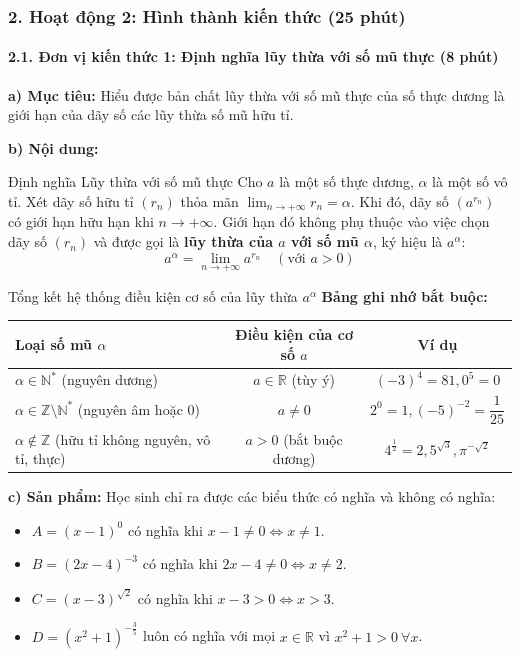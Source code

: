 \documentclass[12pt, a4paper]{article}
\begin{document}
\subsubsection*{2. Hoạt động 2: Hình thành kiến thức (25 phút)}

\paragraph{2.1. Đơn vị kiến thức 1: Định nghĩa lũy thừa với số mũ thực (8 phút)}

\noindent \textbf{a) Mục tiêu:}
Hiểu được bản chất lũy thừa với số mũ thực của số thực dương là giới hạn của dãy số các lũy thừa số mũ hữu tỉ.

\noindent \textbf{b) Nội dung:}
\begin{pedabox}{Định nghĩa Lũy thừa với số mũ thực}
Cho $a$ là một số thực dương, $\alpha$ là một số vô tỉ.
Xét dãy số hữu tỉ $(r_n)$ thỏa mãn $\lim_{n \to +\infty} r_n = \alpha$.
Khi đó, dãy số $(a^{r_n})$ có giới hạn hữu hạn khi $n \to +\infty$.
Giới hạn đó không phụ thuộc vào việc chọn dãy số $(r_n)$ và được gọi là \textbf{lũy thừa của $a$ với số mũ $\alpha$}, ký hiệu là $a^\alpha$:
$$a^\alpha = \lim_{n \to +\infty} a^{r_n} \quad (\text{với } a > 0)$$
\end{pedabox}

\begin{scaffoldbox}{Tổng kết hệ thống điều kiện cơ số của lũy thừa $a^\alpha$}
\textbf{Bảng ghi nhớ bắt buộc:}
\begin{center}
\begin{tabular}{|l|c|c|}
    \hline
    \textbf{Loại số mũ $\alpha$} & \textbf{Điều kiện của cơ số $a$} & \textbf{Ví dụ} \\ \hline
    $\alpha \in \mathbb{N}^*$ (nguyên dương) & $a \in \mathbb{R}$ (tùy ý) & $(-3)^4 = 81, 0^5 = 0$ \\ \hline
    $\alpha \in \mathbb{Z} \setminus \mathbb{N}^*$ (nguyên âm hoặc $0$) & $a \neq 0$ & $2^0 = 1, (-5)^{-2} = \dfrac{1}{25}$ \\ \hline
    $\alpha \notin \mathbb{Z}$ (hữu tỉ không nguyên, vô tỉ, thực) & $a > 0$ (bắt buộc dương) & $4^{\frac{1}{2}} = 2, 5^{\sqrt{3}}, \pi^{-\sqrt{2}}$ \\ \hline
\end{tabular}
\end{center}
\end{scaffoldbox}

\noindent \textbf{c) Sản phẩm:}
Học sinh chỉ ra được các biểu thức có nghĩa và không có nghĩa:
\begin{itemize}
    \item $A = (x - 1)^0$ có nghĩa khi $x - 1 \neq 0 \iff x \neq 1$.
    \item $B = (2x - 4)^{-3}$ có nghĩa khi $2x - 4 \neq 0 \iff x \neq 2$.
    \item $C = (x - 3)^{\sqrt{2}}$ có nghĩa khi $x - 3 > 0 \iff x > 3$.
    \item $D = (x^2 + 1)^{-\frac{3}{5}}$ luôn có nghĩa với mọi $x \in \mathbb{R}$ vì $x^2 + 1 > 0 \ \forall x$.
\end{itemize}
\end{document}
